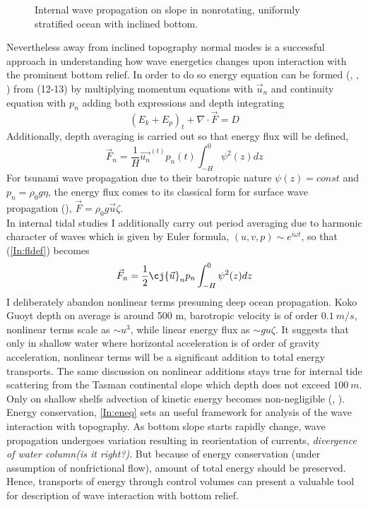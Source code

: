 \begin{figure}
\caption{Internal wave propagation on slope in nonrotating, uniformly stratified ocean with inclined bottom.}
\end{figure}
Nevertheless away from inclined topography normal modes is a successful approach in understanding how wave energetics changes upon interaction with the prominent bottom relief. In order to do so energy equation can be formed (\cite{nekrasov1990energy}, \cite{kowalik2013oceanography}, \cite{kelly2012cascade}) from (12-13) by multiplying momentum equations with $\vec{u}_n$ and continuity equation with $p_n$ adding both expressions and depth integrating 
\begin{equation}
(E_k + E_p)_t + \nabla \cdot \vec{F} = D \label{In:eneq}
\end{equation}
Additionally, depth averaging is carried out so that energy flux will be defined,
\begin{equation}
\vec{F}_n = \frac{1}{H} \vec{u_n}^(t) p_n(t) \int_{-H}^0 \psi^2(z) dz \label{In:fldef}
\end{equation}
For tsunami wave propagation due to their barotropic nature $\psi(z) = const$ and $p_n = \rho_0 g \eta$, the energy flux comes to its classical form for surface wave propagation  (\cite{henry2001representation}), $\vec{F} = \rho_0 g \vec{u} \zeta$.\\
In internal tidal studies I additionally carry out period averaging due to harmonic character of waves which is given by Euler formula, $(u,v,p) \sim e^{i \omega t}$, so that (\ref{In:fldef}) becomes
\begin{align}
\vec{F}_n = \frac{1}{2} \cj{\vec{u}}_n p_n \int_{-H}^0 \psi^2(z) dz
\end{align}
I deliberately abandon nonlinear terms presuming deep ocean propagation. Koko Guoyt depth on average is around 500 m, barotropic velocity is of order $0.1~m/s$, nonlinear terms scale as $\sim u^3$, while linear energy flux as $\sim g u \zeta$. It suggests that only in shallow water where horizontal acceleration is of order of gravity acceleration, nonlinear terms will be a significant addition to total energy transports. The same discussion on nonlinear additions stays true for internal tide scattering from the Tasman continental slope which depth does not exceed $100~m$. Only on shallow shelfs advection of kinetic energy becomes non-negligible (\cite{kang2012energetics}, \cite{nash2012unpredictable}).\\
Energy conservation, \ref{In:eneq} sets an useful framework for analysis of the wave interaction with topography. As bottom slope starts rapidly change, wave propagation undergoes variation resulting in reorientation of currents, \textit{divergence of water column(is it right?)}. But because of energy conservation (under assumption of nonfrictional flow), amount of total energy should be preserved. Hence, transports of energy through control volumes can present a valuable tool for description of wave interaction with bottom relief.\\

